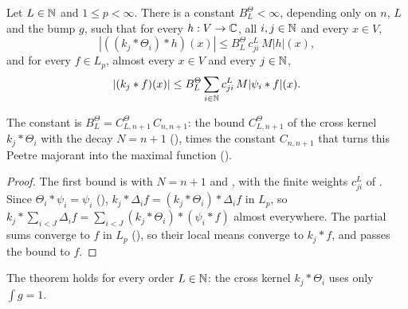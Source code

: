 \begin{theorem}
\label{thm:local-means-by-blocks}
\leanok
{}
Let $L \in \mathbb{N}$ and $1 \leq p < \infty$. There is a constant $B^\Theta_L < \infty$, depending only
on $n$, $L$ and the bump $g$, such that for every $h : V \to \mathbb{C}$, all $i, j \in \mathbb{N}$ and every
$x \in V$,
\[
  |((k_j * \Theta_i) * h)(x)| \leq B^\Theta_L \, c^L_{ji} \, M|h|(x) ,
\]
and for every $f \in L_p$, almost every $x \in V$ and every $j \in \mathbb{N}$,
\[
  |(k_j * f)(x)| \leq B^\Theta_L \sum_{i \in \mathbb{N}} c^L_{ji} \, M|\psi_i * f|(x) .
\]
\end{theorem}

The constant is $B^\Theta_L = C^\Theta_{L,n+1} \, C_{n,n+1}$: the bound $C^\Theta_{L,n+1}$ of the
cross kernel $k_j * \Theta_i$ with the decay $N = n + 1$ (), times
the constant $C_{n,n+1}$ that turns this Peetre majorant into the maximal function
().

\begin{proof}
\leanok
The first bound is  with $N = n + 1$ and
, with the finite weights $c^L_{ji}$ of
. Since
$\Theta_i * \psi_i = \psi_i$ (),
$k_j * \Delta_i f = (k_j * \Theta_i) * \Delta_i f$ in $L_p$, so
$k_j * \sum_{i < J} \Delta_i f = \sum_{i < J} (k_j * \Theta_i) * (\psi_i * f)$ almost
everywhere. The partial sums converge to $f$ in $L_p$ (), so their local
means converge to $k_j * f$, and  passes the bound to $f$.
\end{proof}

The theorem holds for every order $L \in \mathbb{N}$: the cross kernel $k_j * \Theta_i$ uses only
$\int g = 1$.

